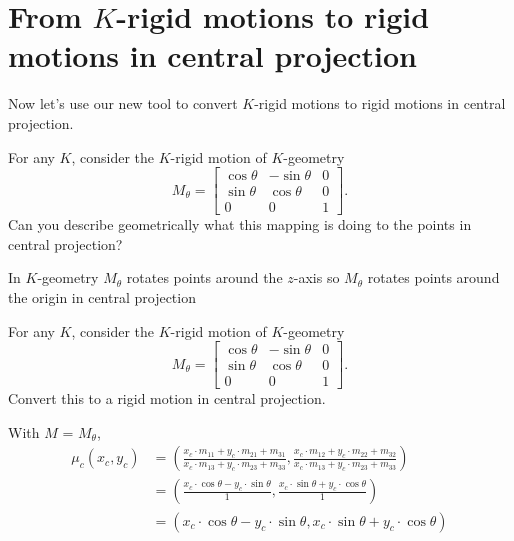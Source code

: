 \documentclass[newpage,hints,handout]{ximera}
\begin{document}
\section{From $K$-rigid motions to rigid motions in central projection}

Now let's use our new tool to convert $K$-rigid motions to rigid motions in central projection. 



\begin{problem}
  For any $K$, consider the $K$-rigid motion of $K$-geometry
  \[
  M_\theta=
  \begin{bmatrix}
    \cos\theta & -\sin\theta & 0\\
    \sin\theta & \cos\theta & 0\\
    0 & 0 & 1
  \end{bmatrix}.
  \]
  Can you describe geometrically what this mapping is doing to the
  points in central projection?
  
  \begin{freeResponse}
  In $K$-geometry $M_\theta$ rotates points around the $z$-axis so $M_\theta$ rotates points around the origin in central projection
  \end{freeResponse}
\end{problem}


\begin{problem}
  For any $K$, consider the $K$-rigid motion of $K$-geometry
  \[
  M_\theta=
  \begin{bmatrix}
    \cos\theta & -\sin\theta & 0\\
    \sin\theta & \cos\theta & 0\\
    0 & 0 & 1
  \end{bmatrix}.
  \]
  Convert this to a rigid motion in central projection.
  \begin{freeResponse}
   With $M$ = $M_\theta$,
  \begin{align*}
  \mu_c(x_c,y_c) &= \left( \frac{x_c\cdot m_{11} + y_c\cdot m_{21} + m_{31}}{x_c\cdot m_{13} + y_c\cdot m_{23} + m_{33}},
    \frac{x_c\cdot m_{12} + y_c\cdot m_{22} + m_{32}}{x_c\cdot m_{13} + y_c\cdot m_{23} + m_{33}} \right) \\
    &= \left( \frac{x_c\cdot \cos\theta - y_c\cdot \sin\theta}{1},
    \frac{x_c\cdot \sin\theta + y_c \cdot \cos\theta}{1} \right) \\
    &= \left( x_c\cdot \cos\theta - y_c\cdot \sin\theta,
    x_c\cdot \sin\theta+ y_c \cdot \cos\theta \right)
  \end{align*}
  \end{freeResponse}
\end{problem}
\end{document}
